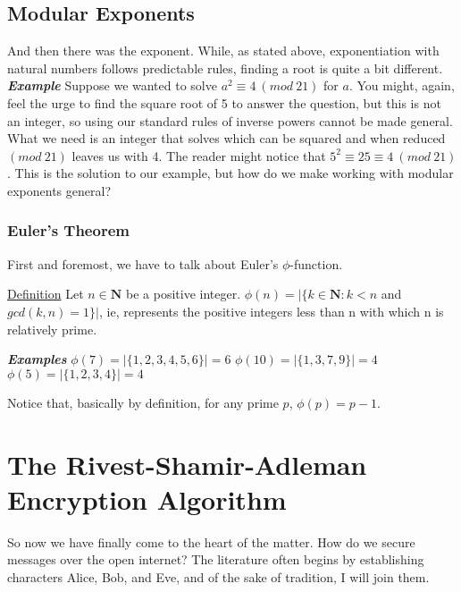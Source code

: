 \documentclass{article}
\begin{document}
        \subsection{Modular Exponents}
            And then there was the exponent.  While, as stated above, exponentiation with natural numbers follows predictable rules, finding a root is quite a bit different.  
            \textbf{\textit{Example}} Suppose we wanted to solve $a^{2}\equiv 4\ (mod\ 21)$  for $a$.  
            You might, again, feel the urge to find the square root of 5 to answer the question, but this is not an integer, so using our standard rules of inverse powers cannot be made general.  
            What we need is an integer that solves which can be squared and when reduced $(mod\ 21)$ leaves us with 4.  
            The reader might notice that $5^2\equiv 25 \equiv 4\ (mod\ 21)$.  This is the solution to our example, but how do we make working with modular exponents general?
            
            \subsubsection{Euler's Theorem}
                First and foremost, we have to talk about Euler's $\phi$-function.
                
                \noindent\underline{Definition} Let $n\in\mathbf{N}$ be a positive integer. $\phi(n)=|\{k\in\mathbf{N}:k<n$ and $gcd(k,n)=1\}|$, ie, represents the positive integers less than n with which n is relatively prime.
                
                \textbf{\textit{Examples}}
                \hspace*{\fill}
                    {$ \phi(7)=|\{1,2,3,4,5,6\}|=6$} \hfill {$ \phi(10)=|\{1,3,7,9\}|=4 $} \hfill {$ \phi(5)=|\{1,2,3,4\}|=4 $}
                \hspace*{\fill}
                
                Notice that, basically by definition, for any prime $p$, $\phi(p)=p-1$.
	        
	\section{The Rivest-Shamir-Adleman Encryption Algorithm}
        So now we have finally come to the heart of the matter.  How do we secure messages over the open internet?  The literature often begins by establishing characters Alice, Bob, and Eve, and of the sake of tradition, I will join them.
     
\end{document}
